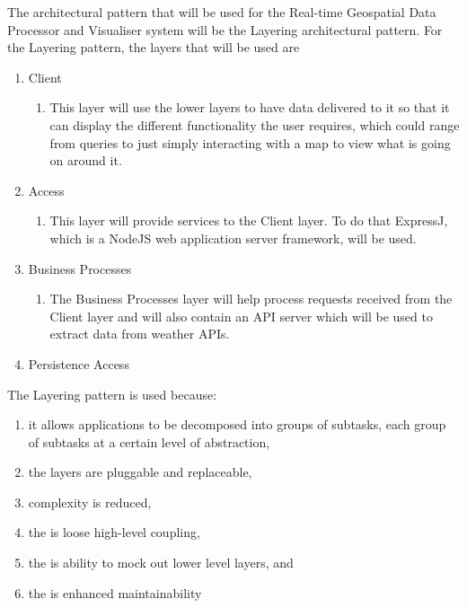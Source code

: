The architectural pattern that will be used for the Real-time Geospatial Data Processor and Visualiser system will be the Layering architectural pattern. \newline
For the Layering pattern, the layers that will be used are
\begin{enumerate}
	\item Client
		\begin{enumerate}
			\item This layer will use the lower layers to have data delivered to it so that it can display the different functionality the user requires, which could range from queries to just simply interacting with a map to view what is going on around it.
		\end{enumerate}
	\item Access
		\begin{enumerate}
			\item This layer will provide services to the Client layer. To do that ExpressJ, which is a NodeJS web application server framework, will be used.
		\end{enumerate}
	\item Business Processes
		\begin{enumerate}
			\item The Business Processes layer will help process requests received from the Client layer and will also contain an API server which will be used to extract data from weather APIs.
		\end{enumerate}
	\item Persistence Access
\end{enumerate}


The Layering pattern is used because:
\begin{enumerate}	
	\item it allows applications to be decomposed into groups of subtasks, each group of subtasks at a certain level of abstraction,
	\item the layers are pluggable and replaceable,
	\item complexity is reduced,
	\item the is loose high-level coupling,
	\item the is ability to mock out lower level layers, and
	\item the is enhanced maintainability
\end{enumerate}